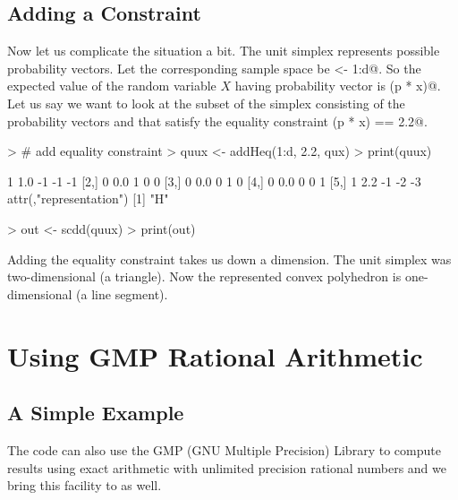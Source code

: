 \documentclass{article}
\begin{document}
\subsection{Adding a Constraint}

Now let us complicate the situation a bit.  The unit simplex represents
possible probability vectors.  Let the corresponding sample space be
\verb@x <- 1:d@.  So the expected value of the random variable $X$
having probability vector \verb@p@ is
\verb@sum(p * x)@.  Let us say we want to look at the
subset of the simplex consisting of the
probability vectors \verb@p@ and that satisfy the equality constraint
\verb@sum(p * x) == 2.2@.
\begin{Schunk}
\begin{Sinput}
> # add equality constraint
> quux <- addHeq(1:d, 2.2, qux)
> print(quux)
\end{Sinput}
\begin{Soutput}
     [,1] [,2] [,3] [,4] [,5]
[1,]    1  1.0   -1   -1   -1
[2,]    0  0.0    1    0    0
[3,]    0  0.0    0    1    0
[4,]    0  0.0    0    0    1
[5,]    1  2.2   -1   -2   -3
attr(,"representation")
[1] "H"
\end{Soutput}
\begin{Sinput}
> out <- scdd(quux)
> print(out)
\end{Sinput}
\end{Schunk}
Adding the equality constraint takes us down a dimension.  The unit
simplex was two-dimensional (a triangle).  Now the represented convex
polyhedron is one-dimensional (a line segment).

\section{Using GMP Rational Arithmetic} \label{sec:gmp}

\subsection{A Simple Example}

The \verb@cddlib@ code can also use the GMP (GNU Multiple Precision) Library
to compute results using exact arithmetic with unlimited precision rational
numbers and we bring this facility to \verb@rcdd@ as well.
\end{document}

